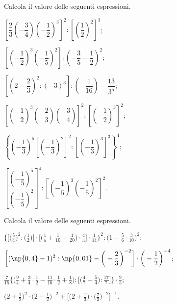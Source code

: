 \begin{esercizio}[\Ast]%
Calcola il valore delle seguenti espressioni.
\begin{multicols}{2}
\begin{enumeratea}
\spazielenx
\item $\left[\dfrac{2}{3}\left(-\dfrac{3}{4}\right)\left(-\dfrac{1}{2}\right)^3\right]^2:\left[\left(\dfrac{1}{2}\right)^2\right]^3$;
\item $\left[\left(-\dfrac{1}{2}\right)^3\left(-\dfrac{1}{5}\right)^2\right]:\left(-\dfrac{3}{5}-\dfrac{1}{2}\right)^2$;
\item $\left[\left(2-\dfrac{2}{3}\right)^2:(-3)^3\right]:\left(-\dfrac{1}{16}\right)-\dfrac{13}{3^5}$;
\item $\left[\left(-\dfrac{1}{2}\right)^3\left(-\dfrac{2}{3}\right)\left(-\dfrac{3}{4}\right)\right]^2:\left[\left(-\dfrac{1}{2}\right)^3\right]^2$;
\item $\left\lbrace\left(-\dfrac{1}{3}\right)^5\left[\left(-\dfrac{1}{3}\right)^2\right]^2:\left[\left(-\dfrac{1}{3}\right)^3\right]^3\right\rbrace^4$;
\item $\left[\dfrac{\left(-\dfrac{1}{5}\right)^5}{\left(-\dfrac{1}{5}\right)^2}\right]^4:\left[\left(-\dfrac{1}{5}\right)^3\left(-\dfrac{1}{5}\right)^2\right]^2$.
\end{enumeratea}
\end{multicols}
\end{esercizio}

\begin{esercizio}[\Ast]%
 Calcola il valore delle seguenti espressioni.
\begin{enumeratea}
\spazielenx
\item $\displaystyle{\bigg\{\bigg[\bigg(\frac{5}{4}\bigg)^{2}:\bigg(\frac{1}{2}\bigg)\bigg]\cdot%
\bigg[\bigg(\frac{1}{5}+\frac{1}{10}+\frac{1}{20}\bigg)\cdot\frac{4}{5}\bigg]\cdot%
\frac{1}{14}\bigg\}^{2}:\bigg(1-\frac{5}{6}\cdot\frac{3}{10}\bigg)^{2}}$;
\item $\displaystyle{\bigg[(\np{0,4}-1)^{2}:\np{0,01}-\bigg(-{\frac{2}{3}}\bigg)^{-2}\bigg]\cdot
\bigg(-{\frac{1}{2}}\bigg)^{-4}}$;
\item $\displaystyle{\frac{7}{15}\bigg\{\bigg(\frac{9}{4}+\frac{3}{4}\cdot
{\frac{1}{2}}-\frac{11}{16}\cdot\frac{1}{2}+\frac{1}{8}\bigg):\bigg[\bigg(\frac{4}{7}+\frac{5}{4}\bigg):\frac{17}{7}\bigg]\bigg\}\cdot
{\frac{9}{5}}}$;
\item $\displaystyle{\bigg(2+\frac{1}{2}\bigg)^{2}\cdot\bigg(2-\frac{1}{2}\bigg)^{-2}+\bigg[\bigg(2+\frac{1}{3}\bigg)\cdot
\bigg(\frac{7}{3}\bigg)^{-2}\bigg]^{-1}}$.
\end{enumeratea}
\end{esercizio}

